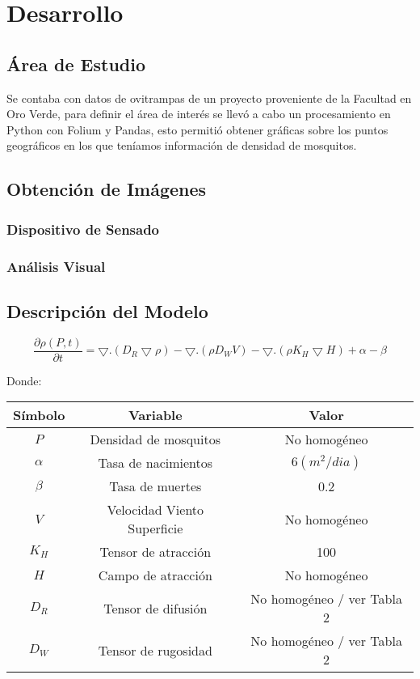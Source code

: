 

\section{Desarrollo}

\subsection{Área de Estudio}

Se contaba con datos de ovitrampas de un proyecto proveniente de la Facultad en Oro Verde, para definir el área de interés se llevó a cabo un procesamiento en Python con Folium y Pandas, esto permitió obtener gráficas sobre los puntos geográficos en los que teníamos información de densidad de mosquitos.

\subsection{Obtención de Imágenes}

\subsubsection{Dispositivo de Sensado}



\subsubsection{Análisis Visual}

\subsection{Descripción del Modelo}

$$\frac{\partial \rho(P,t)}{\partial t}=\bigtriangledown .(D_R \bigtriangledown \rho)-\bigtriangledown.(\rho D_W V)- \bigtriangledown . (\rho K_H \bigtriangledown H) + \alpha - \beta$$

Donde:

\begin{center}
	\begin{tabular}{|c | c | c|} 
		\hline
		\textbf{Símbolo} & \textbf{Variable} & \textbf{Valor}\\
		\hline
		$$P$$ & Densidad de mosquitos & No homogéneo \\
		\hline
		$\alpha$  & Tasa de nacimientos & $6 (m^2/dia)$ \\
		\hline
		$\beta$  & Tasa de muertes             & 0.2 \\
		\hline
		$V$   & Velocidad Viento Superficie & No homogéneo \\
		\hline
		$K_H$   & Tensor de atracción         & 100 \\
		\hline
		$H$    & Campo de atracción          & No homogéneo \\
		\hline
		$D_R$   & Tensor de difusión          & No homogéneo / ver Tabla 2 \\
		\hline
		$D_W$   & Tensor de rugosidad         & No homogéneo / ver Tabla 2\\
		\hline
	\end{tabular}
\end{center}


